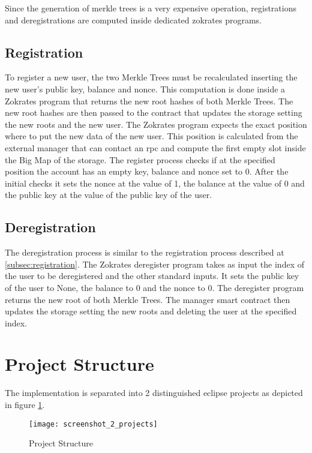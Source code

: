 Since the generation of merkle trees is a very expensive operation, registrations and deregistrations are computed inside dedicated zokrates programs. 

\subsection{Registration\label{subsec:registration}}

To register a new user, the two Merkle Trees must be recalculated inserting the new user's public key, balance and nonce. This computation is done inside a Zokrates program that returns the new root hashes of both Merkle Trees. The new root hashes are then passed to the contract that updates the storage setting the new roots and the new user. The Zokrates program expects the exact position where to put the new data of the new user. This position is calculated from the external manager that can contact an rpc and compute the first empty slot inside the Big Map of the storage. The register process checks if at the specified position the account has an empty key, balance and nonce set to 0. After the initial checks it sets the nonce at the value of 1, the balance at the value of 0 and the public key at the value of the public key of the user.

\subsection{Deregistration}

The deregistration process is similar to the registration process described at \ref{subsec:registration}. The Zokrates deregister program takes as input the index of the user to be deregistered and the other standard inputs. It sets the public key of the user to None, the balance to 0 and the nonce to 0. The deregister program returns the new root of both Merkle Trees. The manager smart contract then updates the storage setting the new roots and deleting the user at the specified index. 

\section{Project Structure\label{sec:projectstructure}}

The implementation is separated into 2 distinguished eclipse projects as depicted in figure \ref{fig:projects}.

\begin{figure}[htb]
  \centering
  \texttt{[image: screenshot\_2\_projects]}
  \caption{Project Structure}
  \label{fig:projects}
\end{figure}

